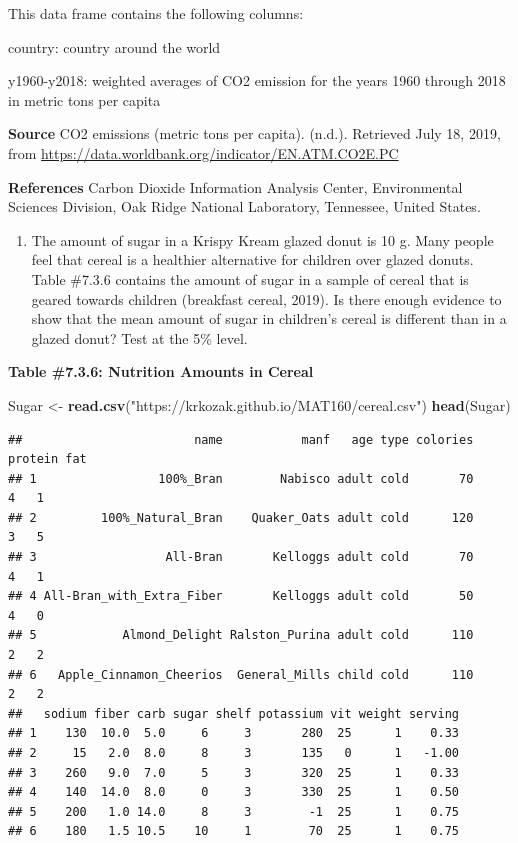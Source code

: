 \documentclass[
]{book}
\newenvironment{Shaded}{\begin{snugshade}}{\end{snugshade}}
\newcommand{\KeywordTok}[1]{\textcolor[rgb]{0.13,0.29,0.53}{\textbf{#1}}}
\newcommand{\NormalTok}[1]{#1}
\newcommand{\StringTok}[1]{\textcolor[rgb]{0.31,0.60,0.02}{#1}}
\providecommand{\tightlist}{%
  \setlength{\itemsep}{0pt}\setlength{\parskip}{0pt}}
\begin{document}
This data frame contains the following columns:

country: country around the world

y1960-y2018: weighted averages of CO2 emission for the years 1960 through 2018 in metric tons per capita

\textbf{Source}
CO2 emissions (metric tons per capita). (n.d.). Retrieved July 18, 2019, from \url{https://data.worldbank.org/indicator/EN.ATM.CO2E.PC}

\textbf{References}
Carbon Dioxide Information Analysis Center, Environmental Sciences Division, Oak Ridge National Laboratory, Tennessee, United States.

\begin{enumerate}
\def\labelenumi{\arabic{enumi}.}
\setcounter{enumi}{1}
\tightlist
\item
  The amount of sugar in a Krispy Kream glazed donut is 10 g. Many people feel that cereal is a healthier alternative for children over glazed donuts. Table \#7.3.6 contains the amount of sugar in a sample of cereal that is geared towards children (breakfast cereal, 2019). Is there enough evidence to show that the mean amount of sugar in children's cereal is different than in a glazed donut? Test at the 5\% level.
\end{enumerate}

\textbf{Table \#7.3.6: Nutrition Amounts in Cereal}

\begin{Shaded}
\begin{Highlighting}[]
\NormalTok{Sugar <-}\StringTok{ }\KeywordTok{read.csv}\NormalTok{(}\StringTok{"https://krkozak.github.io/MAT160/cereal.csv"}\NormalTok{)}
\KeywordTok{head}\NormalTok{(Sugar)}
\end{Highlighting}
\end{Shaded}

\begin{verbatim}
##                        name           manf   age type colories protein fat
## 1                 100%_Bran        Nabisco adult cold       70       4   1
## 2         100%_Natural_Bran    Quaker_Oats adult cold      120       3   5
## 3                  All-Bran       Kelloggs adult cold       70       4   1
## 4 All-Bran_with_Extra_Fiber       Kelloggs adult cold       50       4   0
## 5            Almond_Delight Ralston_Purina adult cold      110       2   2
## 6   Apple_Cinnamon_Cheerios  General_Mills child cold      110       2   2
##   sodium fiber carb sugar shelf potassium vit weight serving
## 1    130  10.0  5.0     6     3       280  25      1    0.33
## 2     15   2.0  8.0     8     3       135   0      1   -1.00
## 3    260   9.0  7.0     5     3       320  25      1    0.33
## 4    140  14.0  8.0     0     3       330  25      1    0.50
## 5    200   1.0 14.0     8     3        -1  25      1    0.75
## 6    180   1.5 10.5    10     1        70  25      1    0.75
\end{verbatim}
\end{document}
